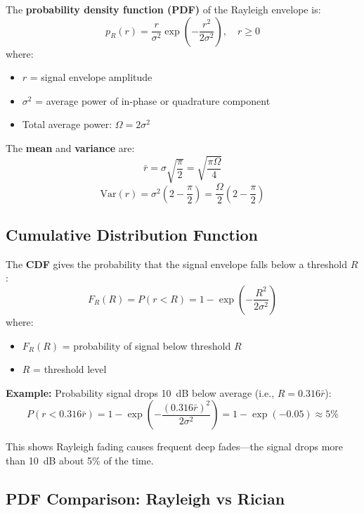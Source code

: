 The \textbf{probability density function (PDF)} of the Rayleigh envelope is:
\begin{equation}
p_R(r) = \frac{r}{\sigma^2} \exp\left(-\frac{r^2}{2\sigma^2}\right), \quad r \geq 0
\end{equation}
where:
\begin{itemize}
\item $r$ = signal envelope amplitude
\item $\sigma^2$ = average power of in-phase or quadrature component
\item Total average power: $\Omega = 2\sigma^2$
\end{itemize}

The \textbf{mean} and \textbf{variance} are:
\begin{equation}
\bar{r} = \sigma\sqrt{\frac{\pi}{2}} = \sqrt{\frac{\pi \Omega}{4}}
\end{equation}
\begin{equation}
\text{Var}(r) = \sigma^2\left(2 - \frac{\pi}{2}\right) = \frac{\Omega}{2}\left(2 - \frac{\pi}{2}\right)
\end{equation}

\subsection{Cumulative Distribution Function}

The \textbf{CDF} gives the probability that the signal envelope falls below a threshold $R$:
\begin{equation}
F_R(R) = P(r < R) = 1 - \exp\left(-\frac{R^2}{2\sigma^2}\right)
\end{equation}
where:
\begin{itemize}
\item $F_R(R)$ = probability of signal below threshold $R$
\item $R$ = threshold level
\end{itemize}

\textbf{Example:} Probability signal drops 10~dB below average (i.e., $R = 0.316\bar{r}$):
\begin{equation}
P(r < 0.316\bar{r}) = 1 - \exp\left(-\frac{(0.316\bar{r})^2}{2\sigma^2}\right) = 1 - \exp(-0.05) \approx 5\%
\end{equation}

This shows Rayleigh fading causes frequent deep fades---the signal drops more than 10~dB about 5\% of the time.

\subsection{PDF Comparison: Rayleigh vs Rician}

